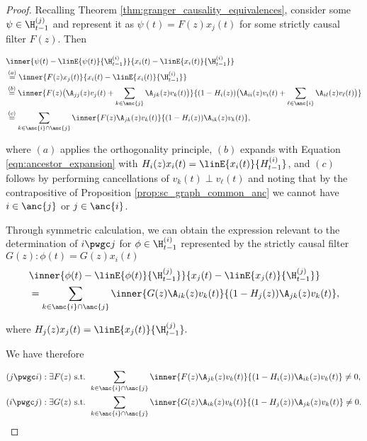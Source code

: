 \begin{proof}
  Recalling Theorem \ref{thm:granger_causality_equivalences}, consider
  some $\psi \in \H_{t - 1}^{(j)}$ and represent it as
  $\psi(t) = F(z)x_j(t)$ for some strictly causal filter $F(z)$.
  Then

  \begin{align*}
    &\inner{\psi(t) - \linE{\psi(t)}{\H_{t - 1}^{(i)}}}{x_i(t) - \linE{x_i(t)}{\H_{t - 1}^{(i)}}}\\
    &\overset{(a)}{=} \inner{F(z)x_j(t)}{x_i(t) - \linE{x_i(t)}{\H_{t - 1}^{(i)}}}\\
    &\overset{(b)}{=} \inner{F(z)\big(\A_{jj}(z)v_j(t) + \sum_{k \in \anc{j}}\A_{jk}(z)v_k(t)\big)}{(1 - H_i(z))\big(\A_{ii}(z)v_i(t) + \sum_{\ell \in \anc{i}}\A_{i\ell}(z)v_\ell(t)\big)}\\
    &\overset{(c)}{=} \sum_{k \in \anc{i}\cap\anc{j}}\inner{F(z)\A_{jk}(z)v_k(t)}{(1 - H_i(z))\A_{ik}(z)v_k(t)},
  \end{align*}

  where $(a)$ applies the orthogonality principle, $(b)$ expands with
  Equation \eqref{eqn:ancestor_expansion} with
  $H_i(z)x_i(t) = \linE{x_i(t)}{H_{t - 1}^{(i)}}$, and $(c)$ follows by
  performing cancellations of $v_k(t) \perp v_\ell(t)$ and noting that
  by the contrapositive of Proposition \ref{prop:sc_graph_common_anc}
  we cannot have $i \in \anc{j}$ or $j \in \anc{i}$.

  Through symmetric calculation, we can obtain the expression relevant
  to the determination of $i \pwgc j$ for $\phi \in \H_{t - 1}^{(i)}$ represented by the strictly causal filter $G(z): \phi(t) = G(z)x_i(t)$
  \begin{align*}
    &\inner{\phi(t) - \linE{\phi(t)}{\H_{t - 1}^{(j)}}}{x_j(t) - \linE{x_j(t)}{\H_{t - 1}^{(j)}}}\\
    &= \sum_{k \in \anc{i} \cap \anc{j}}\inner{G(z)\A_{ik}(z)v_k(t)}{(1 - H_j(z))\A_{jk}(z)v_k(t)},
  \end{align*}

  where $H_j(z)x_j(t) = \linE{x_j(t)}{\H_{t - 1}^{(j)}}.$

  We have therefore

  \begin{align}
      &(j \pwgc i): \exists F(z) \text{ s.t. } \sum_{k \in \anc{i} \cap \anc{j}}\inner{F(z)\A_{jk}(z)v_k(t)}{(1 - H_i(z))\A_{ik}(z)v_k(t)} \ne 0,\\
      &(i \pwgc j): \exists G(z) \text{ s.t. } \sum_{k \in \anc{i} \cap \anc{j}}\inner{G(z)\A_{ik}(z)v_k(t)}{(1 - H_j(z))\A_{jk}(z)v_k(t)} \ne 0.
  \end{align}


\end{proof}
